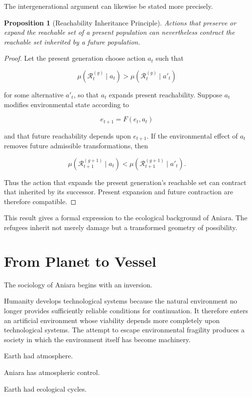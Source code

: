 \documentclass[11pt,oneside]{book}
\newtheorem{proposition}[theorem]{Proposition}
\theoremstyle{definition}
\theoremstyle{remark}
\newcommand{\R}{\mathcal{R}}
\begin{document}
The intergenerational argument can likewise be stated more precisely.

\begin{proposition}[Reachability Inheritance Principle]
Actions that preserve or expand the reachable set of a present population can nevertheless contract the reachable set inherited by a future population.
\end{proposition}

\begin{proof}
Let the present generation choose action \(a_t\) such that

\[
\mu(\R_t^{(g)}\mid a_t)
>
\mu(\R_t^{(g)}\mid a'_t)
\]

for some alternative \(a'_t\), so that \(a_t\) expands present reachability. Suppose \(a_t\) modifies environmental state according to

\[
e_{t+1}=F(e_t,a_t)
\]

and that future reachability depends upon \(e_{t+1}\). If the environmental effect of \(a_t\) removes future admissible transformations, then

\[
\mu(\R_{t+1}^{(g+1)}\mid a_t)
<
\mu(\R_{t+1}^{(g+1)}\mid a'_t).
\]

Thus the action that expands the present generation's reachable set can contract that inherited by its successor. Present expansion and future contraction are therefore compatible.
\end{proof}

This result gives a formal expression to the ecological background of Aniara. The refugees inherit not merely damage but a transformed geometry of possibility.

\section{From Planet to Vessel}

The sociology of Aniara begins with an inversion.

Humanity develops technological systems because the natural environment no longer provides sufficiently reliable conditions for continuation. It therefore enters an artificial environment whose viability depends more completely upon technological systems. The attempt to escape environmental fragility produces a society in which the environment itself has become machinery.

Earth had atmosphere.

Aniara has atmospheric control.

Earth had ecological cycles.
\end{document}
